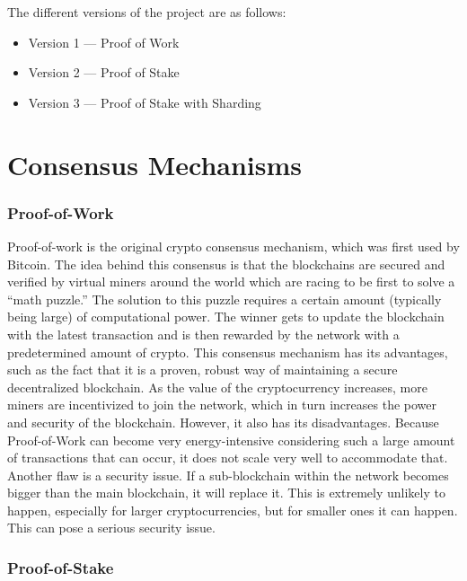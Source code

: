 The different versions of the project are as follows:
  \begin{itemize}
    \item Version 1 — Proof of Work
    \item Version 2 — Proof of Stake
    \item Version 3 — Proof of Stake with Sharding
  \end{itemize}
 

\section{Consensus Mechanisms}

\subsubsection{Proof-of-Work}

Proof-of-work is the original crypto consensus mechanism, which was first used by Bitcoin. The idea behind this consensus is that the blockchains are secured and verified by virtual miners around the world which are racing to be first to solve a “math puzzle.” The solution to this puzzle requires a certain amount (typically being large) of computational power. The winner gets to update the blockchain with the latest transaction and is then rewarded by the network with a predetermined amount of crypto. This consensus mechanism has its advantages, such as the fact that it is a proven, robust way of maintaining a secure decentralized blockchain. As the value of the cryptocurrency increases, more miners are incentivized to join the network, which in turn increases the power and security of the blockchain. However, it also has its disadvantages. Because Proof-of-Work can become very energy-intensive considering such a large amount of transactions that can occur, it does not scale very well to accommodate that. Another flaw is a security issue. If a sub-blockchain within the network becomes bigger than the main blockchain, it will replace it. This is extremely unlikely to happen, especially for larger cryptocurrencies, but for smaller ones it can happen. This can pose a serious security issue.

\subsubsection{Proof-of-Stake}

